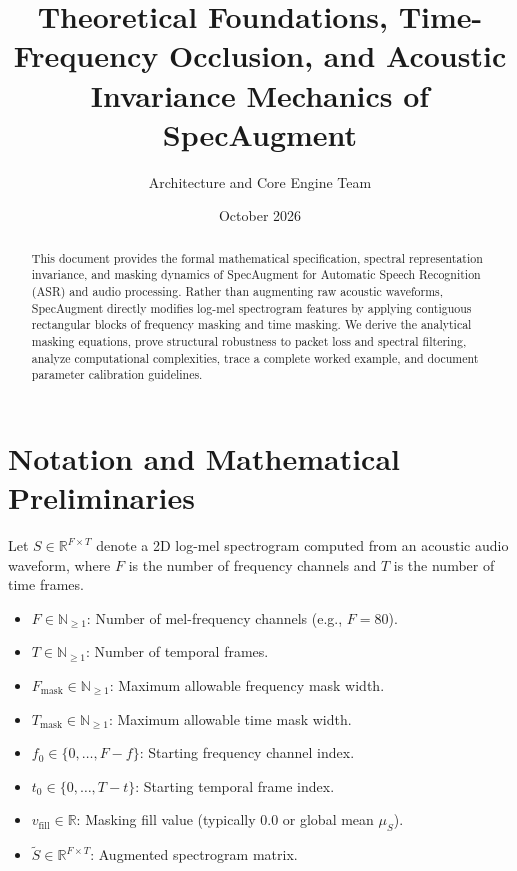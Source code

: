 \documentclass[11pt,a4paper]{article}
\title{\textbf{Theoretical Foundations, Time-Frequency Occlusion, and Acoustic Invariance Mechanics of SpecAugment}}
\author{Architecture and Core Engine Team}
\date{October 2026}
\theoremstyle{definition}
\begin{document}
\maketitle

\begin{abstract}
This document provides the formal mathematical specification, spectral representation invariance, and masking dynamics of SpecAugment for Automatic Speech Recognition (ASR) and audio processing. Rather than augmenting raw acoustic waveforms, SpecAugment directly modifies log-mel spectrogram features by applying contiguous rectangular blocks of frequency masking and time masking. We derive the analytical masking equations, prove structural robustness to packet loss and spectral filtering, analyze computational complexities, trace a complete worked example, and document parameter calibration guidelines.
\end{abstract}

\section{Notation and Mathematical Preliminaries}

Let $S \in \mathbb{R}^{F \times T}$ denote a 2D log-mel spectrogram computed from an acoustic audio waveform, where $F$ is the number of frequency channels and $T$ is the number of time frames.

\begin{itemize}
    \item $F \in \mathbb{N}_{\ge 1}$: Number of mel-frequency channels (e.g., $F = 80$).
    \item $T \in \mathbb{N}_{\ge 1}$: Number of temporal frames.
    \item $F_{\text{mask}} \in \mathbb{N}_{\ge 1}$: Maximum allowable frequency mask width.
    \item $T_{\text{mask}} \in \mathbb{N}_{\ge 1}$: Maximum allowable time mask width.
    \item $f_0 \in \{0, \dots, F - f\}$: Starting frequency channel index.
    \item $t_0 \in \{0, \dots, T - t\}$: Starting temporal frame index.
    \item $v_{\text{fill}} \in \mathbb{R}$: Masking fill value (typically $0.0$ or global mean $\mu_S$).
    \item $\tilde{S} \in \mathbb{R}^{F \times T}$: Augmented spectrogram matrix.
\end{itemize}
\end{document}
